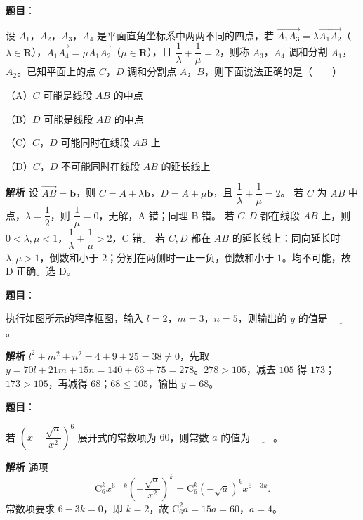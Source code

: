 \begin{answer}

\textbf{题目}：

设 $A_1$，$A_2$，$A_3$，$A_4$ 是平面直角坐标系中两两不同的四点，若 $\overrightarrow{A_1A_3}=\lambda\overrightarrow{A_1A_2}$（$\lambda\in\mathbf R$），$\overrightarrow{A_1A_4}=\mu\overrightarrow{A_1A_2}$（$\mu\in\mathbf R$），且 $\dfrac1\lambda+\dfrac1\mu=2$，则称 $A_3$，$A_4$ 调和分割 $A_1$，$A_2$。已知平面上的点 $C$，$D$ 调和分割点 $A$，$B$，则下面说法正确的是\mbox{（　　）}

（A）$C$ 可能是线段 $AB$ 的中点

（B）$D$ 可能是线段 $AB$ 的中点

（C）$C$，$D$ 可能同时在线段 $AB$ 上

（D）$C$，$D$ 不可能同时在线段 $AB$ 的延长线上

\textbf{解析}
设 $\overrightarrow{AB}=\boldsymbol b$，则 $C=A+\lambda\boldsymbol b$，$D=A+\mu\boldsymbol b$，且 $\dfrac1\lambda+\dfrac1\mu=2$。
若 $C$ 为 $AB$ 中点，$\lambda=\dfrac12$，则 $\dfrac1\mu=0$，无解，A 错；同理 B 错。
若 $C,D$ 都在线段 $AB$ 上，则 $0<\lambda,\mu<1$，$\dfrac1\lambda+\dfrac1\mu>2$，C 错。
若 $C,D$ 都在 $AB$ 的延长线上：同向延长时 $\lambda,\mu>1$，倒数和小于 $2$；分别在两侧时一正一负，倒数和小于 $1$。均不可能，故 D 正确。选 D。


\end{answer}
\begin{answer}

\textbf{题目}：

执行如图所示的程序框图，输入 $l=2$，$m=3$，$n=5$，则输出的 $y$ 的值是 $\underline{\qquad}$。
\nopagebreak[4]
\begin{center}\end{center}
\nopagebreak[4]
\textbf{解析}
$l^2+m^2+n^2=4+9+25=38\neq0$，先取 $y=70l+21m+15n=140+63+75=278$。$278>105$，减去 $105$ 得 $173$；$173>105$，再减得 $68$；$68\leqslant105$，输出 $y=68$。


\end{answer}
\begin{answer}

\textbf{题目}：

若 $\left(x-\dfrac{\sqrt a}{x^2}\right)^6$ 展开式的常数项为 $60$，则常数 $a$ 的值为 $\underline{\qquad}$。

\textbf{解析}
通项
\nopagebreak[4]
\[\mathrm C_6^k x^{6-k}\left(-\frac{\sqrt a}{x^2}\right)^k=\mathrm C_6^k(-\sqrt a)^k x^{6-3k}.\]
常数项要求 $6-3k=0$，即 $k=2$，故 $\mathrm C_6^2a=15a=60$，$a=4$。


\end{answer}
